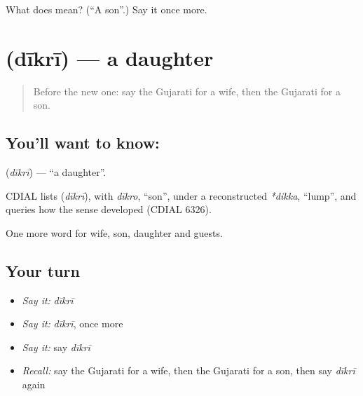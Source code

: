 \begin{tcolorbox}[breakable,colback=teal!4,colframe=teal!35!black,title={Before you move on}]
What does  mean? (\textquotedblleft{}A son\textquotedblright{}.) Say it once more.
\end{tcolorbox}
\section[\texorpdfstring{\gu{દીકરી} (dīkrī)}{દીકરી (dīkrī)}]{ (dīkrī) — a daughter}

\label{lesson:GU-C53-daughter}



\begin{quote}
Before the new one: say the Gujarati for a wife, then the Gujarati for a son.
\end{quote}

\subsection*{You'll want to know: }
\textbf{} (\emph{dīkrī}) — \textquotedblleft{}a daughter\textquotedblright{}.

\begin{cousinweb}
CDIAL lists \textbf{} (\emph{dīkrī}), with \emph{dīkro}, \textquotedblleft{}son\textquotedblright{}, under a reconstructed \emph{*dikka}, \textquotedblleft{}lump\textquotedblright{}, and queries how the sense developed (CDIAL 6326).
\end{cousinweb}

\begin{grammarlens}[title={What you've built}]
One more word for wife, son, daughter and guests.
\end{grammarlens}

\subsection*{Your turn}
\begin{itemize}
\raggedright
  \item \emph{Say it:} \emph{dīkrī}
  \item \emph{Say it:} \emph{dīkrī}, once more
  \item \emph{Say it:} say \emph{dīkrī}
  \item \emph{Recall:} say the Gujarati for a wife, then the Gujarati for a son, then say \emph{dīkrī} again
\end{itemize}

